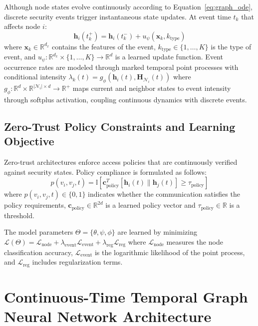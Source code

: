 \documentclass[lettersize,journal]{IEEEtran}
\newcommand{\R}{\mathbb{R}}
\begin{document}
Although node states evolve continuously according to Equation~\eqref{eq:graph_ode}, discrete security events trigger instantaneous state updates. At event time $t_k$ that affects node $i$:
\begin{equation}
\mathbf{h}_i(t_k^+) = \mathbf{h}_i(t_k^-) + u_\psi(\mathbf{x}_k, k_{\text{type}})
\label{eq:event_update}
\end{equation}
where $\mathbf{x}_k \in \R^{d_x}$ contains the features of the event, $k_{\text{type}} \in \{1, \ldots, K\}$ is the type of event, and $u_\psi : \R^{d_x} \times \{1, \ldots, K\} \rightarrow \R^d$ is a learned update function. Event occurrence rates are modeled through marked temporal point processes with conditional intensity $\lambda_k(t) = g_\phi(\mathbf{h}_i(t), \mathbf{H}_{\mathcal{N}_i}(t))$ where $g_\phi : \R^d \times \R^{|\mathcal{N}_i| \times d} \rightarrow \R^+$ maps current and neighbor states to event intensity through softplus activation, coupling continuous dynamics with discrete events.

\subsection{Zero-Trust Policy Constraints and Learning Objective}

Zero-trust architectures enforce access policies that are continuously verified against security states. Policy compliance is formulated as follows:
\begin{equation}
p(v_i, v_j, t) = \mathbb{I}[\mathbf{c}^T_{\text{policy}} [\mathbf{h}_i(t) \| \mathbf{h}_j(t)] \geq \tau_{\text{policy}}]
\label{eq:policy}
\end{equation}
where $p(v_i, v_j, t) \in \{0, 1\}$ indicates whether the communication satisfies the policy requirements, $\mathbf{c}_{\text{policy}} \in \R^{2d}$ is a learned policy vector and $\tau_{\text{policy}} \in \R$ is a threshold.

The model parameters $\Theta = \{\theta, \psi, \phi\}$ are learned by minimizing $\mathcal{L}(\Theta) = \mathcal{L}_{\text{node}} + \lambda_{\text{event}} \mathcal{L}_{\text{event}} + \lambda_{\text{reg}} \mathcal{L}_{\text{reg}}$ where $\mathcal{L}_{\text{node}}$ measures the node classification accuracy, $\mathcal{L}_{\text{event}}$ is the logarithmic likelihood of the point process, and $\mathcal{L}_{\text{reg}}$ includes regularization terms.

\section{Continuous-Time Temporal Graph Neural Network Architecture}
\label{sec:methodology}
\end{document}
